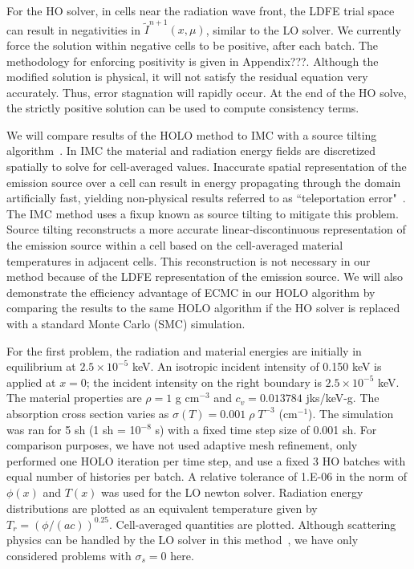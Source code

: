 \documentclass{mc2013}
\begin{document}
For the HO solver, in cells near the radiation wave front, the LDFE trial space can result in negativities in
$\tilde{I}^{n+1}(x,\mu)$, similar to the LO solver.  We currently force the solution within negative cells to be
positive, after each batch. The methodology for enforcing positivity is given in Appendix???.
  Although the modified solution is
physical, it will not satisfy the residual equation very accurately.  Thus, error stagnation will
rapidly occur. At the end of the HO solve, the strictly positive solution can be used
to compute consistency terms.


We will compare results of the HOLO method to IMC with
a source tilting algorithm~\cite{jayenne}. In IMC the material and radiation energy fields are discretized spatially to solve for cell-averaged values.
Inaccurate spatial representation of the emission source over a cell can result in
energy propagating through the domain artificially fast, yielding non-physical
results referred to as ``teleportation error"~\cite{teleportation}.  The IMC method uses a fixup known as source tilting
to mitigate this problem.  Source tilting reconstructs a more accurate
linear-discontinuous representation of the
emission source within a cell based on the cell-averaged material temperatures in adjacent
cells. This reconstruction is not necessary in our method because of the LDFE representation of the
emission source. We will also demonstrate the efficiency advantage of ECMC in our HOLO
algorithm by comparing the results to the same HOLO algorithm if the HO solver
is replaced with a standard Monte Carlo (SMC) simulation.




For the first problem, the radiation and material energies are initially in
equilibrium at $2.5\times 10^{-5}$ keV.   An isotropic incident intensity of 0.150 keV is applied
at $x=0$; the incident intensity on the right boundary is $2.5\times10^{-5}$ keV.
The material properties are $\rho = 1$ g cm$^{-3}$ and $c_v = 0.013784$ jks/keV-g. The
absorption cross section varies as $\sigma(T) = 0.001\;\rho\; T^{-3}$ (cm$^{-1}$). The simulation was ran for 5 sh (1 sh =
10$^{-8}$ s) with a fixed time step size of 0.001 sh. For comparison purposes, we
have not used adaptive mesh
refinement, only performed one HOLO iteration per time
step, and use a fixed 3 HO batches with equal number of histories per batch. A relative tolerance of 1.E-06 in the
norm of $\phi(x)$ and $T(x)$ was used for the LO newton solver. Radiation energy
distributions are plotted as an equivalent temperature given by
$T_r=(\phi/(ac))^{0.25}$.  Cell-averaged quantities are plotted.
Although scattering physics
can be handled by the LO solver in this method~\cite{ans_2014}, we have only
considered problems with $\sigma_s = 0$ here.  
\end{document}
